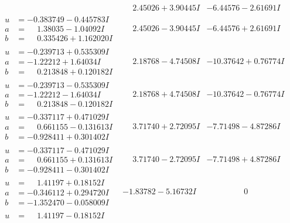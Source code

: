 \documentclass[1p]{elsarticle_modified}
\theoremstyle{definition}
\begin{document}
$$\begin{array}{c|c|c}
 & \phantom{-}2.45026 + 3.90445 I & -6.44576 - 2.61691 I \\ \hline\begin{aligned}
u &= -0.383749 - 0.445783 I \\
a &= \phantom{-}1.38035 - 1.04092 I \\
b &= \phantom{-}0.335426 + 1.162020 I\end{aligned}
 & \phantom{-}2.45026 - 3.90445 I & -6.44576 + 2.61691 I \\ \hline\begin{aligned}
u &= -0.239713 + 0.535309 I \\
a &= -1.22212 + 1.64034 I \\
b &= \phantom{-}0.213848 + 0.120182 I\end{aligned}
 & \phantom{-}2.18768 - 4.74508 I & -10.37642 + 0.76774 I \\ \hline\begin{aligned}
u &= -0.239713 - 0.535309 I \\
a &= -1.22212 - 1.64034 I \\
b &= \phantom{-}0.213848 - 0.120182 I\end{aligned}
 & \phantom{-}2.18768 + 4.74508 I & -10.37642 - 0.76774 I \\ \hline\begin{aligned}
u &= -0.337117 + 0.471029 I \\
a &= \phantom{-}0.661155 - 0.131613 I \\
b &= -0.928411 + 0.301402 I\end{aligned}
 & \phantom{-}3.71740 + 2.72095 I & -7.71498 - 4.87286 I \\ \hline\begin{aligned}
u &= -0.337117 - 0.471029 I \\
a &= \phantom{-}0.661155 + 0.131613 I \\
b &= -0.928411 - 0.301402 I\end{aligned}
 & \phantom{-}3.71740 - 2.72095 I & -7.71498 + 4.87286 I \\ \hline\begin{aligned}
u &= \phantom{-}1.41197 + 0.18152 I \\
a &= -0.346112 + 0.294720 I \\
b &= -1.352470 - 0.058009 I\end{aligned}
 & -1.83782 - 5.16732 I & \phantom{-0.000000 } 0 \\ \hline\begin{aligned}
u &= \phantom{-}1.41197 - 0.18152 I \\

\end{aligned}
\end{array}$$
\end{document}
